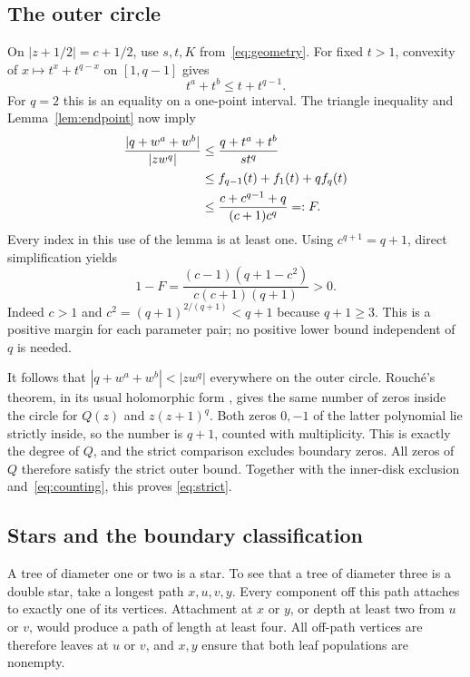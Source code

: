 \documentclass[11pt]{article}
\begin{document}
\subsection*{The outer circle}
On $|z+1/2|=c+1/2$, use $s,t,K$ from~\eqref{eq:geometry}.
For fixed $t>1$, convexity of $x\mapsto t^x+t^{q-x}$ on $[1,q-1]$
gives
\[
 t^a+t^b\leq t+t^{q-1}.
\]
For $q=2$ this is an equality on a one-point interval.
The triangle inequality and Lemma~\ref{lem:endpoint} now imply
\begin{align}
 \frac{|q+w^a+w^b|}{|zw^q|}
 &\leq\frac{q+t^a+t^b}{s t^q}\notag\\
 &\leq f_{q-1}(t)+f_1(t)+qf_q(t)\notag\\
 &\leq\frac{c+c^{q-1}+q}{(c+1)c^q}=:F.\label{eq:domination}
\end{align}
Every index in this use of the lemma is at least one.
Using $c^{q+1}=q+1$, direct simplification yields
\begin{equation}\label{eq:margin}
 1-F=\frac{(c-1)(q+1-c^2)}{c(c+1)(q+1)}>0.
\end{equation}
Indeed $c>1$ and $c^2=(q+1)^{2/(q+1)}<q+1$ because $q+1\geq3$.
This is a positive margin for each parameter pair; no positive lower
bound independent of $q$ is needed.

It follows that $|q+w^a+w^b|<|zw^q|$ everywhere on the outer circle.
Rouch\'e's theorem, in its usual holomorphic form
\cite[Corollary~5.4.3]{Lebl2026}, gives the same number of zeros inside
the circle for $Q(z)$ and $z(z+1)^q$.
Both zeros $0,-1$ of the latter polynomial lie strictly inside, so the
number is $q+1$, counted with multiplicity. This is exactly the degree
of $Q$, and the strict comparison excludes boundary zeros.
All zeros of $Q$ therefore satisfy the strict outer bound. Together with
the inner-disk exclusion and~\eqref{eq:counting}, this proves
\eqref{eq:strict}.

\subsection*{Stars and the boundary classification}
A tree of diameter one or two is a star. To see that a tree of diameter
three is a double star, take a longest path $x,u,v,y$. Every component off
this path attaches to exactly one of its vertices. Attachment at $x$ or
$y$, or depth at least two from $u$ or $v$, would produce a path of
length at least four. All off-path vertices are therefore leaves at
$u$ or $v$, and $x,y$ ensure that both leaf populations are nonempty.
\end{document}
